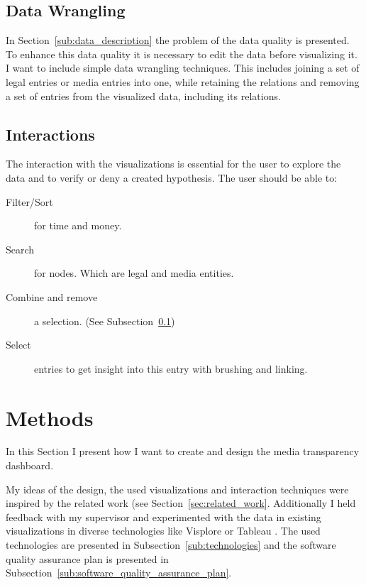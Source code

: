 \documentclass{acmsiggraph}               %
\begin{document}

\subsection{Data Wrangling} %
\label{sub:data_wrangling}

In Section~\ref{sub:data_description} the problem of the data quality is presented. To enhance this data quality it is necessary to edit the data before visualizing it. I want to include simple data wrangling techniques. \cite{Kandel2011} This includes joining a set of legal entries or media entries into one, while retaining the relations and removing a set of entries from the visualized data, including its relations.


\subsection{Interactions} %
\label{sub:interactions}

The interaction with the visualizations is essential for the user to explore the data and to verify or deny a created hypothesis. The user should be able to:

\begin{description}
  \item[Filter/Sort] for time and money.
  \item[Search] for nodes. Which are legal and media entities.
  \item[Combine and remove] a selection. (See Subsection~\ref{sub:data_wrangling})
  \item[Select] entries to get insight into this entry with brushing and linking. 
\end{description}


\section{Methods} %
\label{sec:method}

In this Section I present how I want to create and design the media transparency dashboard. \par
My ideas of the design, the used visualizations and interaction techniques were inspired by the related work (see Section~\ref{sec:related_work}. Additionally I held feedback with my supervisor and experimented with the data in existing visualizations in diverse technologies like Visplore \cite{Piringer2009} or Tableau \cite{tableau}. The used technologies are presented in Subsection~\ref{sub:technologies} and the software quality assurance plan is presented in Subsection~\ref{sub:software_quality_assurance_plan}.
\end{document}
